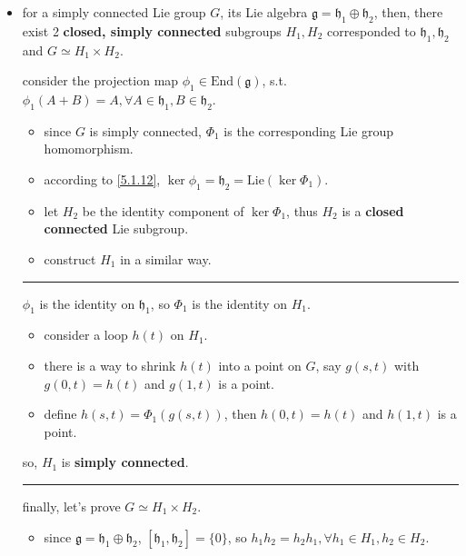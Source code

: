 \begin{itemize}
	\item for a simply connected Lie group $G$, its Lie algebra $\mathfrak{g} = \mathfrak{h}_1 \oplus \mathfrak{h}_2$, then, there exist 2 \textbf{closed, simply connected} subgroups $H_1, H_2$ corresponded to $\mathfrak{h}_1, \mathfrak{h}_2$ and $G \simeq H_1 \times H_2$.
	
	\begin{tcolorbox}[title=proof:]
		consider the projection map $\phi_1 \in \mathrm{End}(\mathfrak{g})$, s.t. $\phi_1(A + B) = A, \forall A \in \mathfrak{h}_1, B \in \mathfrak{h}_2$.
		\begin{itemize}
			\item since $G$ is simply connected, $\Phi_1$ is the corresponding Lie group homomorphism.
			
			\item according to \eqref{5.1.12}, $\ker{\phi_1} = \mathfrak{h}_2 = \mathrm{Lie}(\ker \Phi_1)$.
			
			\item let $H_2$ be the identity component of $\ker \Phi_1$, thus $H_2$ is a \textbf{closed connected} Lie subgroup.
			
			\item construct $H_1$ in a similar way.
		\end{itemize}
		
		\noindent\rule[0.5ex]{\linewidth}{0.5pt} %
		
		$\phi_1$ is the identity on $\mathfrak{h}_1$, so $\Phi_1$ is the identity on $H_1$.
		\begin{itemize}
			\item consider a loop $h(t)$ on $H_1$.
			
			\item there is a way to shrink $h(t)$ into a point on $G$, say $g(s, t)$ with $g(0, t) = h(t)$ and $g(1, t)$ is a point.
			
			\item define $h(s, t) = \Phi_1(g(s, t))$, then $h(0, t) = h(t)$ and $h(1, t)$ is a point.
		\end{itemize}
		so, $H_1$ is \textbf{simply connected}.
		
		\noindent\rule[0.5ex]{\linewidth}{0.5pt} %
		
		finally, let's prove $G \simeq H_1 \times H_2$.
		\begin{itemize}
			\item since $\mathfrak{g} = \mathfrak{h}_1 \oplus \mathfrak{h}_2$, $[\mathfrak{h}_1, \mathfrak{h}_2] = \{0\}$, so $h_1 h_2 = h_2 h_1, \forall h_1 \in H_1, h_2 \in H_2$.
			

\end{itemize}
\end{tcolorbox}
\end{itemize}
